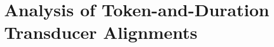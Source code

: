 \documentclass{article}
\begin{document}
\section{Analysis of Token-and-Duration Transducer Alignments}
\end{document}
